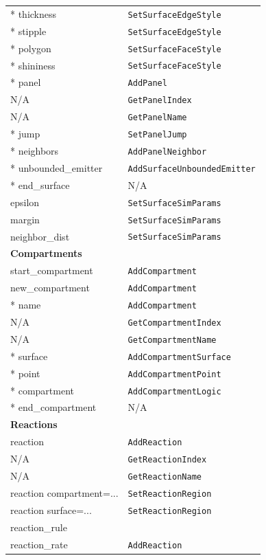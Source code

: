 \documentclass {book}
\newcommand {\ttt} {\texttt}
\begin{document}
\begin{longtable}[c]{ll}
{*} thickness & \ttt{SetSurfaceEdgeStyle}\\
{*} stipple & \ttt{SetSurfaceEdgeStyle}\\
{*} polygon & \ttt{SetSurfaceFaceStyle}\\
{*} shininess & \ttt{SetSurfaceFaceStyle}\\
{*} panel & \ttt{AddPanel}\\
N/A & \ttt{GetPanelIndex}\\
N/A & \ttt{GetPanelName}\\
{*} jump & \ttt{SetPanelJump}\\
{*} neighbors & \ttt{AddPanelNeighbor}\\
{*} unbounded\_emitter & \ttt{AddSurfaceUnboundedEmitter}\\
{*} end\_surface & N/A\\
epsilon & \ttt{SetSurfaceSimParams}\\
margin & \ttt{SetSurfaceSimParams}\\
neighbor\_dist & \ttt{SetSurfaceSimParams}\\
\hline
\multicolumn{2}{l}{\hspace{0.3in}\textbf{Compartments}}\\
\hline
start\_compartment & \ttt{AddCompartment}\\
new\_compartment & \ttt{AddCompartment}\\
{*} name & \ttt{AddCompartment}\\
N/A & \ttt{GetCompartmentIndex}\\
N/A & \ttt{GetCompartmentName}\\
{*} surface & \ttt{AddCompartmentSurface}\\
{*} point & \ttt{AddCompartmentPoint}\\
{*} compartment & \ttt{AddCompartmentLogic}\\
{*} end\_compartment & N/A\\
\hline
\multicolumn{2}{l}{\hspace{0.3in}\textbf{Reactions}}\\
\hline
reaction & \ttt{AddReaction}\\
N/A & \ttt{GetReactionIndex}\\
N/A & \ttt{GetReactionName}\\
reaction compartment=... & \ttt{SetReactionRegion}\\
reaction surface=... & \ttt{SetReactionRegion}\\
reaction\_rule \\ %
reaction\_rate & \ttt{AddReaction}\\

\end{longtable}
\end{document}
